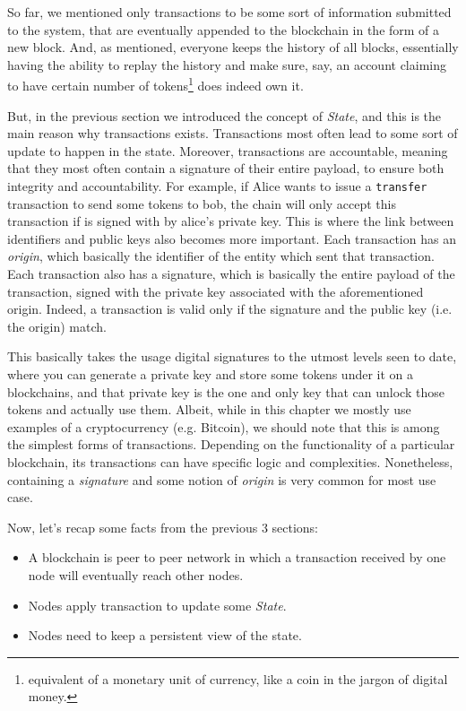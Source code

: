 So far, we mentioned only transactions to be some sort of information submitted to the system, that
are eventually appended to the blockchain in the form of a new block. And, as mentioned, everyone
keeps the history of all blocks, essentially having the ability to replay the history and make sure,
say, an account claiming to have certain number of tokens\footnote{equivalent of a monetary unit of
currency, like a coin in the jargon of digital money.} does indeed own it.

But, in the previous section we introduced the concept of \textit{State}, and this is the main
reason why transactions exists. Transactions most often lead to some sort of update to happen in the
state. Moreover, transactions are accountable, meaning that they most often contain a signature of
their entire payload, to ensure both integrity and accountability. For example, if Alice wants to
issue a \texttt{transfer} transaction to send some tokens to bob, the chain will only accept this
transaction if is signed with by alice's private key. This is where the link between identifiers and
public keys also becomes more important. Each transaction has an \textit{origin}, which basically
the identifier of the entity which sent that transaction. Each transaction also has a signature,
which is basically the entire payload of the transaction, signed with the private key associated
with the aforementioned origin. Indeed, a transaction is valid only if the signature and the public
key (i.e. the origin) match.

This basically takes the usage digital signatures to the utmost levels seen to date, where you can
generate a private key and store some tokens under it on a blockchains, and that private key is the
one and only key that can unlock those tokens and actually use them. Albeit, while in this chapter
we mostly use examples of a cryptocurrency (e.g. Bitcoin), we should note that this is among the
simplest forms of transactions. Depending on the functionality of a particular blockchain, its
transactions can have specific logic and complexities. Nonetheless, containing a \textit{signature}
and some notion of \textit{origin} is very common for most use case.

Now, let's recap some facts from the previous 3 sections:

\begin{itemize}
	\item A blockchain is peer to peer network in which a transaction received by one node will
	eventually reach other nodes.
	\item Nodes apply transaction to update some \textit{State}.
	\item Nodes need to keep a persistent view of the state.
\end{itemize}

